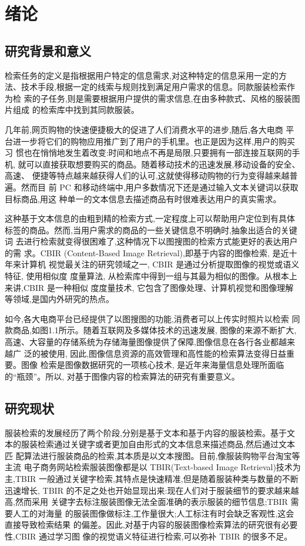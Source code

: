 \chapter{绪论}

\section{研究背景和意义}
检索任务的定义是指根据用户特定的信息需求,对这种特定的信息采用一定的方
法、技术手段,根据一定的线索与规则找到满足用户需求的信息。同款服装检索作为检
索的子任务,则是需要根据用户提供的需求信息,在由多种款式、风格的服装图片组成
的检索库中找到其同款服装。

几年前,网页购物的快速便捷极大的促进了人们消费水平的进步,随后,各大电商
平台进一步将它们的购物应用推广到了用户的手机里。也正是因为这样,用户的购买习
惯也在悄悄地发生着改变:时间和地点不再是局限,只要拥有一部连接互联网的手机,
就可以直接获取想要购买的商品。随着移动技术的迅速发展,移动设备的安全、高速、
便捷等特点越来越获得人们的认可,这就使得移动购物的行为变得越来越普遍。然而目
前 PC 和移动终端中,用户多数情况下还是通过输入文本关键词以获取目标商品,用这
种单一的文本信息去描述商品有时很难表达用户的真实需求。

这种基于文本信息的由粗到精的检索方式,一定程度上可以帮助用户定位到有具体
标签的商品。然而,当用户需求的商品的一些关键信息不明确时,抽象出适合的关键词
去进行检索就变得很困难了,这种情况下以图搜图的检索方式能更好的表达用户的需
求。CBIR (Content-Based Image Retrieval),即基于内容的图像检索, 是近十年来计算机
视觉最关注的研究领域之一, CBIR 是通过分析提取图像的视觉或语义特征, 使用相似度
度量算法, 从检索库中得到一组与其最为相似的图像。从根本上来讲,CBIR 是一种相似
度度量技术, 它包含了图像处理、计算机视觉和图像理解等领域,是国内外研究的热点。

如今,各大电商平台已经提供了以图搜图的功能,消费者可以上传实时照片以检索
同款商品,如图1.1所示。随着互联网及多媒体技术的迅速发展, 图像的来源不断扩大,
高速、大容量的存储系统为存储海量图像提供了保障,图像信息在各行各业都越来越广
泛的被使用, 因此,图像信息资源的高效管理和高性能的检索算法变得日益重要。图像
检索是图像数据研究的一项核心技术, 是近年来海量信息处理所面临的“瓶颈”。所以,
对基于图像内容的检索算法的研究有重要意义。


\section{研究现状}

服装检索的发展经历了两个阶段,分别是基于文本和基于内容的服装检索。基于文
本的服装检索通过关键字或者更加自由形式的文本信息来描述商品,然后通过文本匹
配算法进行服装商品的检索,其本质是以文本搜图。目前,像服装购物平台淘宝等主流
电子商务网站检索服装图像都是以 TBIR(Text-based Image Retrieval)技术为主,TBIR
一般通过关键字检索,其特点是快速精准,但是随着服装种类与数量的不断迅速增长,
TBIR 的不足之处也开始显现出来:现在人们对于服装细节的要求越来越高,然而采用
关键字去标注服装图像无法全面准确的表示服装的细节信息;TBIR 需要人工的对海量
的服装图像做标注,工作量很大;人工标注有时会缺乏客观性,这会直接导致检索结果
的偏差。因此,对基于内容的服装图像检索算法的研究很有必要性,CBIR 通过学习图
像的视觉语义特征进行检索,可以弥补 TBIR 的很多不足。

